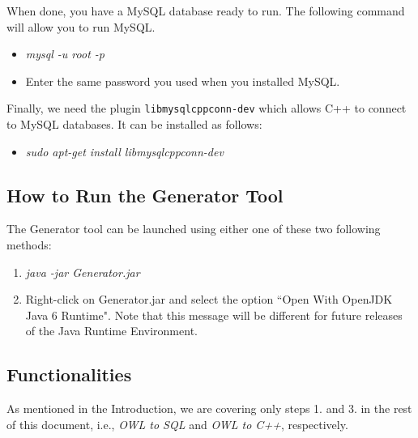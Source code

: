 When done, you have a MySQL database ready to run. The following command will allow you to run MySQL.

\begin{itemize}
 \item \textit{mysql -u root -p}
 \item Enter the same password you used when you installed MySQL.
\end{itemize}

Finally, we need the plugin \texttt{libmysqlcppconn-dev} which allows C++ to connect to MySQL databases. It can be installed as follows:
\begin{itemize}
 \item \textit{sudo apt-get install libmysqlcppconn-dev}
\end{itemize}

\subsection{How to Run the Generator Tool}\label{s:run}
The Generator tool can be launched using either one of these two following methods:
\begin{enumerate}
 \item \textit{java -jar Generator.jar}
 \item Right-click on Generator.jar and select the option ``Open With OpenJDK Java 6 Runtime". Note that this message will be different for future releases of the Java Runtime Environment.
\end{enumerate}


\subsection{Functionalities}\label{s:generator}
As mentioned in the Introduction, we are covering only steps 1. and 3. in the rest of this document, i.e., \textit{OWL to SQL} and \textit{OWL to C++}, respectively.

